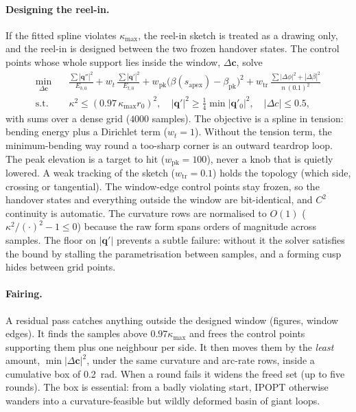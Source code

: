 \documentclass[11pt,a4paper]{article}
\newcommand{\vect}[1]{\boldsymbol{#1}}
\begin{document}
\paragraph{Designing the reel-in.}
If the fitted spline violates $\kappa_{\max}$, the reel-in sketch is treated
as a drawing only, and the reel-in is designed between the two frozen handover
states. The control points whose whole support lies inside the window,
$\Delta\vect c$, solve
\begin{equation}
\begin{aligned}
  \min_{\Delta\vect c}\quad & \frac{\sum|\vect q''|^2}{E_{b,0}}
     + w_t\,\frac{\sum|\vect q'|^2}{E_{t,0}}
     + w_\mathrm{pk}\bigl(\beta(s_\mathrm{apex})-\beta_\mathrm{pk}\bigr)^2
     + w_\mathrm{tr}\,\frac{\sum|\Delta\phi|^2+|\Delta\beta|^2}{n\,(0.1)^2} \\
  \text{s.t.}\quad & \kappa^2\le(0.97\,\kappa_{\max} r_0)^2,\quad
     |\vect q'|^2\ge\tfrac14\min|\vect q'_0|^2,\quad |\Delta c|\le0.5,
\end{aligned}
\label{eq:design}
\end{equation}
with sums over a dense grid ($4000$ samples). The objective is a spline in
tension: bending energy plus a Dirichlet term ($w_t=1$). Without the tension
term, the minimum-bending way round a too-sharp corner is an outward teardrop
loop. The peak elevation is a target to hit ($w_\mathrm{pk}=100$), never a knob
that is quietly lowered. A weak tracking of the sketch ($w_\mathrm{tr}=0.1$)
holds the topology (which side, crossing or tangential). The window-edge
control points stay frozen, so the handover states and everything outside the
window are bit-identical, and $C^2$ continuity is automatic. The
curvature rows are normalised to $O(1)$ ($\kappa^2/(\cdot)^2-1\le0$) because the
raw form spans orders of magnitude across samples. The floor on $|\vect q'|$ prevents a
subtle failure: without it the solver satisfies the bound by stalling the
parametrisation between samples, and a forming cusp hides between grid
points.

\paragraph{Fairing.}
A residual pass catches anything outside the designed window (figures,
window edges). It finds the samples above $0.97\kappa_{\max}$ and frees
the control points supporting them plus one neighbour per side. It then
moves them by the \emph{least} amount, $\min|\Delta\vect c|^2$, under the
same curvature and arc-rate rows, inside a cumulative box of \SI{0.2}{rad}.
When a round fails it widens the freed set (up to five rounds). The box is
essential: from a badly violating start, IPOPT otherwise wanders into a
curvature-feasible but wildly deformed basin of giant loops.
\end{document}
